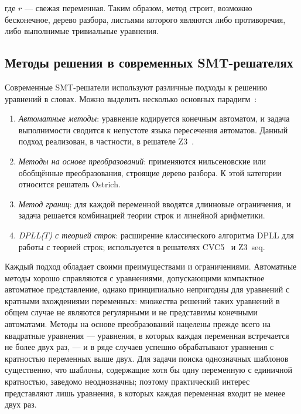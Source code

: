 \documentclass[14pt, russian]{scrartcl}
\begin{document}
где $r$ --- свежая переменная. Таким образом, метод строит, возможно бесконечное, дерево разбора, листьями
которого являются либо противоречия, либо выполнимые тривиальные уравнения.

\subsection{Методы решения в современных SMT-решателях}

Современные SMT-решатели используют различные подходы к решению уравнений в словах.
Можно выделить несколько основных парадигм~\cite{zheng2015,liang2016}:

\begin{enumerate}
\item \emph{Автоматные методы}: уравнение кодируется конечным автоматом, и задача выполнимости
  сводится к непустоте языка пересечения автоматов. Данный подход реализован, в частности,
  в решателе Z3~\cite{demoura2008}.
\item \emph{Методы на основе преобразований}: применяются нильсеновские или обобщённые
  преобразования, строящие дерево разбора. К этой категории относится решатель Ostrich.
\item \emph{Метод границ}: для каждой переменной вводятся длинновые ограничения, и задача
  решается комбинацией теории строк и линейной арифметики.
\item \emph{DPLL($T$) с теорией строк}: расширение классического алгоритма DPLL для
  работы с теорией строк; используется в решателях CVC5~\cite{barbosa2022} и Z3~seq.
\end{enumerate}

Каждый подход обладает своими преимуществами и ограничениями. Автоматные методы
хорошо справляются с уравнениями, допускающими компактное автоматное представление,
однако принципиально непригодны для уравнений с кратными вхождениями переменных:
множества решений таких уравнений в общем случае не являются регулярными и не
представимы конечными автоматами. Методы на основе преобразований нацелены прежде всего на квадратные уравнения ---
уравнения, в которых каждая переменная встречается не более двух раз, --- и в ряде
случаев успешно обрабатывают уравнения с кратностью переменных выше двух. Для задачи
поиска однозначных шаблонов существенно, что шаблоны, содержащие хотя бы одну
переменную с единичной кратностью, заведомо неоднозначны; поэтому практический интерес
представляют лишь уравнения, в которых каждая переменная входит не менее двух раз.
\end{document}

